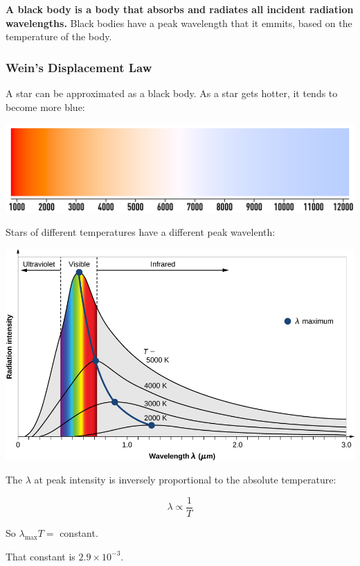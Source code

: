 \documentclass[a4paper, 12pt]{article}
\begin{document}
\textbf{A black body is a body that absorbs and radiates all incident radiation wavelengths.} Black bodies have a peak wavelength that it emmits, based on the temperature of the body.

\subsubsection{Wein's Displacement Law}

A star can be approximated as a black body. As a star gets hotter, it tends to become more blue:

\begin{center}
\includegraphics[width=\textwidth]{images/blackBodyColour.png}
\end{center}

Stars of different temperatures have a different peak wavelenth:

\begin{center}
\includegraphics[width=\textwidth]{images/blackBodyPeakWav.jpg}
\end{center}

The $\lambda$ at peak intensity is inversely proportional to the absolute temperature:

$$
\lambda \propto \frac{1}{T}
$$

So $\lambda_{\text{max}} T =$ constant.

That constant is $2.9 \times 10^{-3}$.
\end{document}
